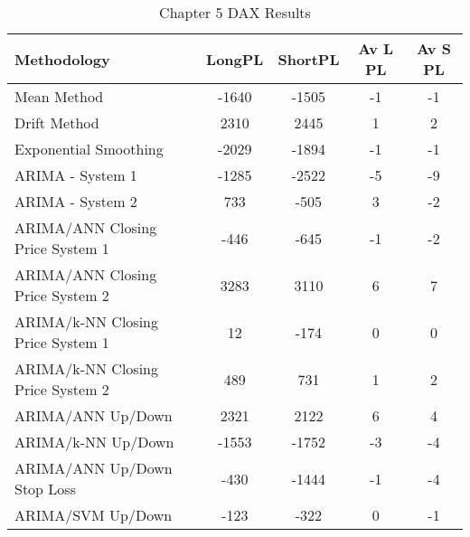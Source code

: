 \begin{table}[ht]
\centering
\caption[Chapter 5 DAX Results]{Chapter 5 DAX Results} 
\label{tab:chp6:dax2_summary}
\begin{tabular}{lcccc}
  \toprule Methodology & LongPL & ShortPL & Av L PL & Av S PL \\ 
  \midrule Mean Method & -1640 & -1505 & -1 & -1 \\ 
  Drift Method & 2310 & 2445 & 1 & 2 \\ 
  Exponential Smoothing & -2029 & -1894 & -1 & -1 \\ 
  ARIMA - System 1 & -1285 & -2522 & -5 & -9 \\ 
  ARIMA - System 2 & 733 & -505 & 3 & -2 \\ 
  ARIMA/ANN Closing Price System 1 & -446 & -645 & -1 & -2 \\ 
  ARIMA/ANN Closing Price System 2 & 3283 & 3110 & 6 & 7 \\ 
  ARIMA/k-NN Closing Price System 1 & 12 & -174 & 0 & 0 \\ 
  ARIMA/k-NN Closing Price System 2 & 489 & 731 & 1 & 2 \\ 
  ARIMA/ANN Up/Down & 2321 & 2122 & 6 & 4 \\ 
  ARIMA/k-NN Up/Down & -1553 & -1752 & -3 & -4 \\ 
  ARIMA/ANN Up/Down Stop Loss & -430 & -1444 & -1 & -4 \\ 
  ARIMA/SVM Up/Down & -123 & -322 & 0 & -1 \\ 
   \bottomrule \end{tabular}
\end{table}
